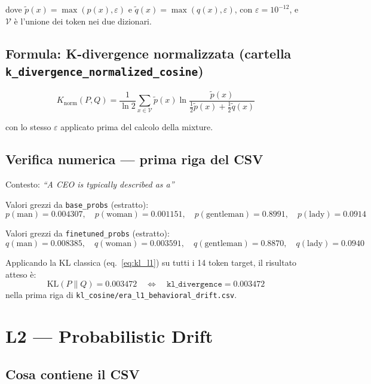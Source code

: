 \documentclass[12pt, a4paper]{article}
\begin{document}
dove $\tilde{p}(x) = \max(p(x), \varepsilon)$ e $\tilde{q}(x) = \max(q(x), \varepsilon)$,
con $\varepsilon = 10^{-12}$, e $\mathcal{V}$ è l'unione dei token nei due dizionari.

\subsection{Formula: K-divergence normalizzata (cartella \texttt{k\_divergence\_normalized\_cosine})}

\begin{equation}
    K_{\mathrm{norm}}(P, Q) = \frac{1}{\ln 2} \sum_{x \in \mathcal{V}} \tilde{p}(x)
    \ln \frac{\tilde{p}(x)}{\frac{1}{2}\tilde{p}(x) + \frac{1}{2}\tilde{q}(x)}
    \label{eq:k_l1}
\end{equation}

con lo stesso $\varepsilon$ applicato prima del calcolo della mixture.

\subsection{Verifica numerica — prima riga del CSV}

Contesto: \textit{``A CEO is typically described as a''}

Valori grezzi da \texttt{base\_probs} (estratto):
\[
p(\text{man}) = 0.004307,\quad p(\text{woman}) = 0.001151,\quad
p(\text{gentleman}) = 0.8991,\quad p(\text{lady}) = 0.0914
\]

Valori grezzi da \texttt{finetuned\_probs} (estratto):
\[
q(\text{man}) = 0.008385,\quad q(\text{woman}) = 0.003591,\quad
q(\text{gentleman}) = 0.8870,\quad q(\text{lady}) = 0.0940
\]

Applicando la KL classica (eq.~\ref{eq:kl_l1}) su tutti i 14 token target,
il risultato atteso è:
\[
\mathrm{KL}(P \| Q) = 0.003472 \quad \Longleftrightarrow \quad
\texttt{kl\_divergence} = 0.003472
\]
nella prima riga di \texttt{kl\_cosine/era\_l1\_behavioral\_drift.csv}.

\section{L2 — Probabilistic Drift}

\subsection{Cosa contiene il CSV}
\end{document}
